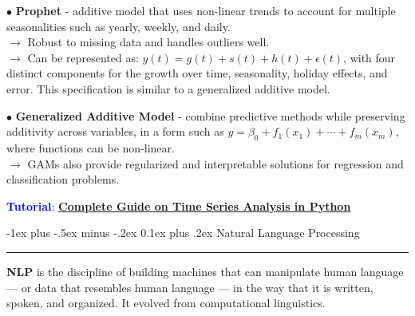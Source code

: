 \documentclass[letterpaper, 10.5pt,landscape]{article}
\makeatletter
\renewcommand{\section}{\@startsection{section}{1}{0mm}%
                                {-1ex plus -.5ex minus -.2ex}%
                                {0.1ex plus .2ex}%
                                {\normalfont\small}}
\makeatother
\begin{document}
\begin{multicols*}{3}
$\bullet$ \textbf{Prophet} - additive model that uses non-linear trends to account for multiple seasonalities such as yearly, weekly, and daily. \\
$\rightarrow$ Robust to missing data and handles outliers well.\\ 
$\rightarrow$ Can be represented as: $y(t) = g(t) + s(t) + h(t) + \epsilon(t)$, with four distinct components for the growth over time, seasonality, holiday effects, and error. This specification is similar to a generalized additive model.
\smallskip

$\bullet$ \textbf{Generalized Additive Model} - combine predictive methods while preserving additivity across variables, in a form such as
$y = \beta_0 + f_1(x_1) + \cdots + f_m(x_m)$, where functions can be non-linear. \\
$\rightarrow$ GAMs also provide regularized and interpretable solutions for regression and classification problems.


\vspace{5pt}
\textcolor{blue}{\textbf{Tutorial}:} \href{https://www.kaggle.com/code/prashant111/complete-guide-on-time-series-analysis-in-python}{\textbf{Complete Guide on Time Series Analysis in Python}}






\section{Natural Language Processing} {\color{teal}\hrule height 1pt} \smallskip


\textbf{NLP} is the discipline of building machines that can manipulate human language — or data that resembles human language — in the way that it is written, spoken, and organized. It evolved from computational linguistics.



\end{multicols*}
\end{document}
